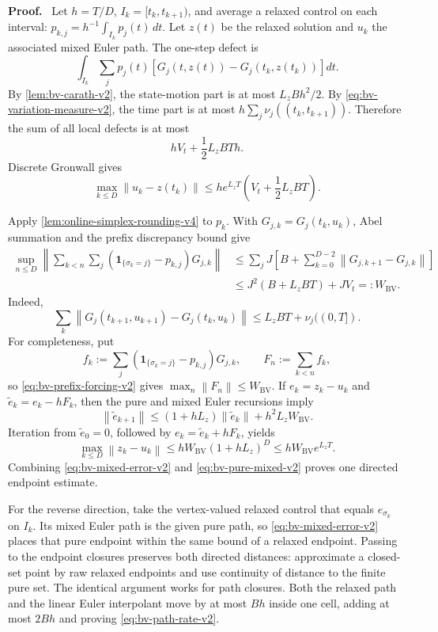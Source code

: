 \documentclass[twoside,11pt]{article}
\renewenvironment{proof}[1][Proof]{\par\noindent\textbf{#1.}\ }{\hfill\BlackBox\par\medskip}
\newcommand{\norm}[1]{\left\lVert #1\right\rVert}
\newcommand{\one}{\mathbf{1}}
\begin{document}
\begin{proof}
Let $h=T/D$, $I_k=[t_k,t_{k+1})$, and average a relaxed control on each
interval:
$p_{k,j}=h^{-1}\int_{I_k}p_j(t)\,dt$.  Let $z(t)$ be the relaxed solution and
$u_k$ the associated mixed Euler path.  The one-step defect is
\[
 \int_{I_k}\sum_jp_j(t)
 \left[G_j(t,z(t))-G_j(t_k,z(t_k))\right]dt.
\]
By \cref{lem:bv-carath-v2}, the state-motion part is at most
$L_zBh^2/2$.  By \eqref{eq:bv-variation-measure-v2}, the time part is at most
$h\sum_j\nu_j((t_k,t_{k+1}))$.  Therefore the sum of all local defects is at
most
\begin{equation}
  hV_t+\frac12L_zBTh.
  \label{eq:bv-total-local-defect-v2}
\end{equation}
Discrete Gronwall gives
\begin{equation}
  \max_{k\le D}\norm{u_k-z(t_k)}
  \le he^{L_zT}\left(V_t+\frac12L_zBT\right).
  \label{eq:bv-mixed-error-v2}
\end{equation}

Apply \cref{lem:online-simplex-rounding-v4} to $p_k$.  With
$G_{j,k}=G_j(t_k,u_k)$, Abel summation and the prefix discrepancy bound give
\begin{align}
 \sup_{n\le D}\left\|\sum_{k<n}\sum_j
   (\one_{\{\sigma_k=j\}}-p_{k,j})G_{j,k}\right\|
 &\le \sum_jJ\left[B+
       \sum_{k=0}^{D-2}\norm{G_{j,k+1}-G_{j,k}}\right]\\
 &\le J^2(B+L_zBT)+JV_t
 =:W_{\mathrm{BV}}.
 \label{eq:bv-prefix-forcing-v2}
\end{align}
Indeed,
\[
 \sum_k\norm{G_j(t_{k+1},u_{k+1})-G_j(t_k,u_k)}
 \le L_zBT+\nu_j((0,T]).
\]
For completeness, put
\[
 f_k:=\sum_j(\one_{\{\sigma_k=j\}}-p_{k,j})G_{j,k},
 \qquad F_n:=\sum_{k<n}f_k,
\]
so \eqref{eq:bv-prefix-forcing-v2} gives
$\max_n\norm{F_n}\le W_{\mathrm{BV}}$.  If
$e_k=z_k-u_k$ and $\widetilde e_k=e_k-hF_k$, then the pure and mixed Euler
recursions imply
\[
 \norm{\widetilde e_{k+1}}
 \le(1+hL_z)\norm{\widetilde e_k}+h^2L_zW_{\mathrm{BV}}.
\]
Iteration from $\widetilde e_0=0$, followed by
$e_k=\widetilde e_k+hF_k$, yields
\begin{equation}
  \max_{k\le D}\norm{z_k-u_k}
  \le hW_{\mathrm{BV}}(1+hL_z)^D
  \le hW_{\mathrm{BV}}e^{L_zT}.
  \label{eq:bv-pure-mixed-v2}
\end{equation}
Combining \eqref{eq:bv-mixed-error-v2} and
\eqref{eq:bv-pure-mixed-v2} proves one directed endpoint estimate.

For the reverse direction, take the vertex-valued relaxed control that equals
$e_{\sigma_k}$ on $I_k$.  Its mixed Euler path is the given pure path, so
\eqref{eq:bv-mixed-error-v2} places that pure endpoint within the same bound
of a relaxed endpoint.  Passing to the endpoint closures preserves both
directed distances: approximate a closed-set point by raw relaxed endpoints
and use continuity of distance to the finite pure set.  The identical argument
works for path closures.  Both the relaxed path and the linear Euler
interpolant move by at most $Bh$ inside one cell, adding at most $2Bh$ and
proving \eqref{eq:bv-path-rate-v2}.
\end{proof}
\end{document}
